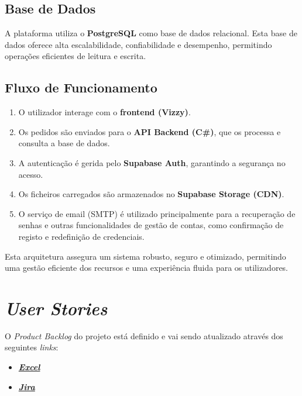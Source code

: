 \documentclass[a4paper, 12pt]{article} %
\begin{document}
\subsection{Base de Dados}
A plataforma utiliza o \textbf{PostgreSQL} como base de dados relacional. Esta base de dados oferece alta escalabilidade, confiabilidade e desempenho, permitindo operações eficientes de leitura e escrita.

\subsection{Fluxo de Funcionamento}
\begin{enumerate}
	\item O utilizador interage com o \textbf{frontend (Vizzy)}.
	\item Os pedidos são enviados para o \textbf{API Backend (C\#)}, que os processa e consulta a base de dados.
	\item A autenticação é gerida pelo \textbf{Supabase Auth}, garantindo a segurança no acesso.
	\item Os ficheiros carregados são armazenados no \textbf{Supabase Storage (CDN)}.
	\item O serviço de email (SMTP) é utilizado principalmente para a recuperação de senhas e outras funcionalidades de gestão de contas, como confirmação de registo e redefinição de credenciais.
\end{enumerate}

Esta arquitetura assegura um sistema robusto, seguro e otimizado, permitindo uma gestão eficiente dos recursos e uma experiência fluida para os utilizadores.


\newpage
\section*{\textit{User Stories}}
O \textit{Product Backlog} do projeto está definido e vai sendo atualizado através dos seguintes \textit{links}:
\begin{itemize} 
	\item\href{https://ipcapt-my.sharepoint.com/:x:/g/personal/nfr\_ipca\_pt/Eb29k3z-aWRGisXGIZopL6IBy5l5QZjY8SjG1iWQDl6c7w?rtime=jE\_b04Za3Ug}{\textbf{\textit{Excel}}}
	\item\href{https://basigraphics.atlassian.net/jira/software/projects/VIZZY/boards/1/backlog?epics=visible&atlOrigin=eyJpIjoiOGNmZTQ2MDRmNjQ1NDY0NDgwNDk0MDJiMGM0MDdlZWYiLCJwIjoiaiJ9}{\textbf{\textit{Jira}}}
	
\end{itemize}
\end{document}
